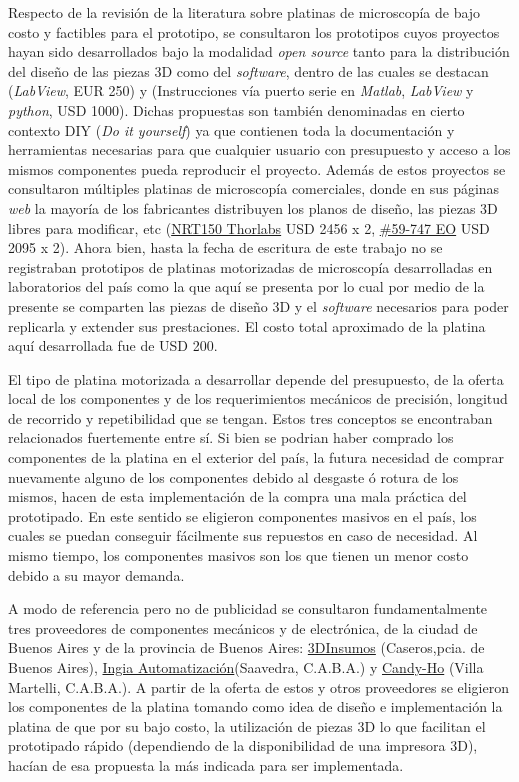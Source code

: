 Respecto de la revisión de la literatura sobre platinas de microscopía de bajo costo y factibles para el prototipo, se consultaron  los prototipos cuyos proyectos hayan sido desarrollados bajo la modalidad \textit{open source} tanto para la distribución del diseño de las piezas 3D como del \textit{software}, dentro de las cuales se destacan \cite{schaa}(\textit{LabView}, EUR 250) y \cite{campbells}(Instrucciones vía puerto serie en \textit{Matlab}, \textit{LabView} y \textit{python}, USD 1000). Dichas propuestas son también denominadas en cierto contexto DIY (\textit{Do it yourself}) ya que contienen toda la documentación y herramientas necesarias para que cualquier usuario con presupuesto y acceso a los mismos componentes pueda reproducir el proyecto. Además de estos proyectos se consultaron múltiples platinas de microscopía comerciales, donde en sus páginas \textit{web} la mayoría de los fabricantes distribuyen los planos de diseño, las piezas 3D libres para modificar, etc (\href{https://www.thorlabs.com/newgrouppage9.cfm?objectgroup\_id=2132}{NRT150 Thorlabs} USD 2456 x 2, \href{https://www.edmundoptics.com/p/150mm-motorized-stage/16419/}{\#59-747 EO} USD 2095 x 2). Ahora bien, hasta la fecha de escritura de este trabajo no se registraban prototipos de platinas motorizadas de microscopía desarrolladas en laboratorios del país como la que aquí se presenta por lo cual por medio de la presente se comparten las piezas de diseño 3D y el \textit{software} necesarios para poder replicarla y extender sus prestaciones. El costo total aproximado de la platina aquí desarrollada fue de USD 200.

El tipo de platina motorizada a desarrollar depende del presupuesto, de la oferta local de los componentes y de los requerimientos mecánicos de precisión, longitud de recorrido y repetibilidad que se tengan. Estos tres conceptos se encontraban relacionados fuertemente entre sí. Si bien se podrian haber comprado los componentes de la platina en el exterior del país, la futura necesidad de comprar nuevamente alguno de los componentes debido al desgaste ó rotura de los mismos, hacen de esta implementación de la compra una mala práctica del prototipado. En este sentido se eligieron componentes masivos en el país, los cuales se puedan conseguir fácilmente sus repuestos en caso de necesidad. Al mismo tiempo, los componentes masivos son los que tienen un menor costo debido a su mayor demanda.

A modo de referencia pero no de publicidad se consultaron fundamentalmente tres proveedores de componentes mecánicos y de electrónica, de la ciudad de Buenos Aires y de la provincia de Buenos Aires: \href{https://3dinsumos.com.ar/}{3DInsumos} (Caseros,pcia. de Buenos Aires), \href{https://ingia.com.ar/}{Ingia Automatización}(Saavedra, C.A.B.A.) y \href{https://candy-ho.com/}{Candy-Ho} (Villa Martelli, C.A.B.A.). A partir de la oferta de estos y otros proveedores se eligieron los componentes de la platina tomando como idea de diseño e implementación la platina de \cite{schaa} que por su bajo costo, la utilización de piezas 3D lo que facilitan el prototipado rápido (dependiendo de la disponibilidad de una impresora 3D), hacían de esa propuesta la más indicada para ser implementada.

